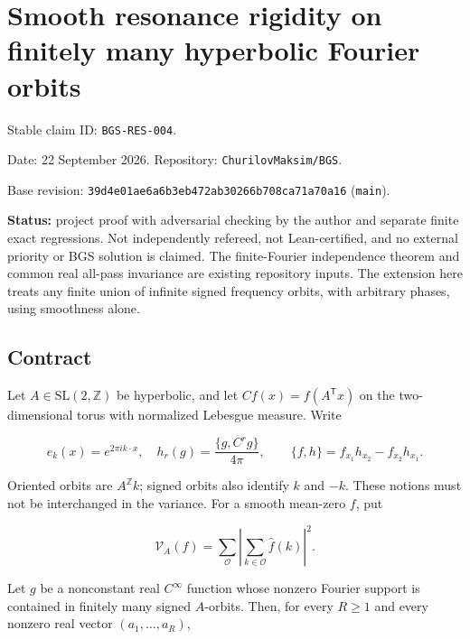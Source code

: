 \hypertarget{smooth-resonance-rigidity-on-finitely-many-hyperbolic-fourier-orbits}{%
\section{Smooth resonance rigidity on finitely many hyperbolic Fourier orbits}\label{smooth-resonance-rigidity-on-finitely-many-hyperbolic-fourier-orbits}}

Stable claim ID: \texttt{BGS-RES-004}.

Date: 22 September 2026. Repository: \texttt{ChurilovMaksim/BGS}.

Base revision: \texttt{39d4e01ae6a6b3eb472ab30266b708ca71a70a16} (\texttt{main}).

\textbf{Status:} project proof with adversarial checking by the author and separate finite exact regressions. Not independently refereed, not Lean-certified, and no external priority or BGS solution is claimed. The finite-Fourier independence theorem and common real all-pass invariance are existing repository inputs. The extension here treats any finite union of infinite signed frequency orbits, with arbitrary phases, using smoothness alone.

\hypertarget{contract}{%
\subsection{Contract}\label{contract}}

Let \(A\in\mathrm{SL}(2,\mathbb Z)\) be hyperbolic, and let \(Cf(x)=f(A^{\mathsf T}x)\) on the two-dimensional torus with normalized Lebesgue measure. Write

\[
 e_k(x)=e^{2\pi i k\cdot x},\quad
 h_r(g)=\frac{\{g,C^r g\}}{4\pi},\qquad
 \{f,h\}=f_{x_1}h_{x_2}-f_{x_2}h_{x_1}.
\]

Oriented orbits are \(A^{\mathbb Z}k\); signed orbits also identify \(k\) and \(-k\). These notions must not be interchanged in the variance. For a smooth mean-zero \(f\), put

\[
 \mathcal V_A(f)=\sum_{\mathcal O}
  \left|\sum_{k\in\mathcal O}\widehat f(k)\right|^2.
\tag{FO.1}
\]

\begin{theorem}\label{pass1:finite_orbit_resonance-1} Let \(g\) be a nonconstant real \(C^\infty\) function whose nonzero Fourier support is contained in finitely many signed \(A\)-orbits. Then, for every \(R\ge1\) and every nonzero real vector \((a_1,\ldots,a_R)\),
\end{theorem}

